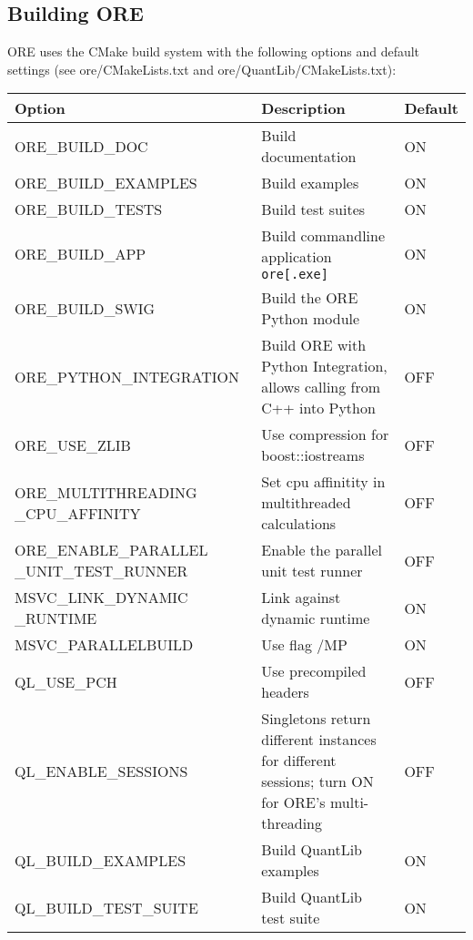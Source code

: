 \subsection{Building ORE}\label{sec:build}

ORE uses the CMake build system with the following options and default settings (see ore/CMakeLists.txt and
ore/QuantLib/CMakeLists.txt):

  {\footnotesize
\begin{tabular}{|p{6cm}|p{7cm}|l|}
  \hline
  Option & Description & Default  \\
  \hline
  \hline
  ORE\_BUILD\_DOC & Build documentation & ON \\
  \hline
  ORE\_BUILD\_EXAMPLES & Build examples & ON \\
  \hline
  ORE\_BUILD\_TESTS & Build test suites  & ON \\
  \hline
  ORE\_BUILD\_APP & Build commandline application {\tt ore[.exe]} & ON \\
  \hline
  ORE\_BUILD\_SWIG & Build the ORE Python module & ON \\
  \hline
  ORE\_PYTHON\_INTEGRATION & Build ORE with Python Integration, allows calling from C++ into Python & OFF \\
  \hline
  ORE\_USE\_ZLIB & Use compression for boost::iostreams & OFF\\
  \hline
  ORE\_MULTITHREADING \_CPU\_AFFINITY & Set cpu affinitity in multithreaded calculations & OFF \\
  \hline
  ORE\_ENABLE\_PARALLEL \_UNIT\_TEST\_RUNNER & Enable the parallel unit test runner & OFF \\ 
  \hline
  MSVC\_LINK\_DYNAMIC \_RUNTIME & Link against dynamic runtime & ON \\
  \hline
  MSVC\_PARALLELBUILD & Use flag /MP & ON \\
  \hline
  \hline
  QL\_USE\_PCH & Use precompiled headers & OFF \\
  \hline
  QL\_ENABLE\_SESSIONS & Singletons return different instances for different sessions; turn ON for ORE's multi-threading & OFF \\
  \hline
  QL\_BUILD\_EXAMPLES & Build QuantLib examples & ON \\
  \hline
  QL\_BUILD\_TEST\_SUITE & Build QuantLib test suite & ON \\
  \hline
\end{tabular}
  }

